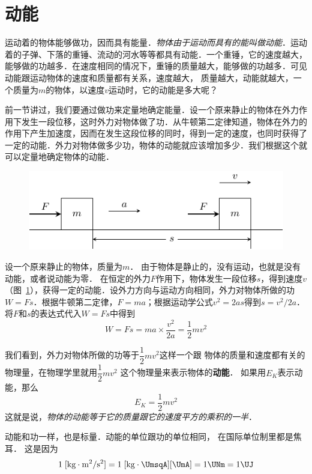 \section{动能}
运动着的物体能够做功，因而具有能量．\textit{物体由于运动而具有的能叫做动能}．运动着的子弹、下落的重锤、流动的河水等等都具有动能．一个重锤，它的速度越大，能够做的功越多．在速度相同的情况下，重锤的质量越大，能够做的功越多．可见动能跟运动物体的速度和质量都有关系，速度越大，
质量越大，动能就越大，一个质量为$m$的物体，以速度$v$运动时，它的动能是多大呢？
	
前一节讲过，我们要通过做功来定量地确定能量．设一个原来静止的物体在外力作用下发生一段位移，这时外力对物体做了功．从牛顿第二定律知道，物体在外力的作用下产生加速度，因而在发生这段位移的同时，得到一定的速度，也同时获得了一定的动能．外力对物体做多少功，物体的动能就应该增加多少．我们根据这个就可以定量地确定物体的动能．

\begin{figure}[htbp]
    \centering
    \includegraphics{fig/A/7-6.pdf}
    \caption{}\label{fig_A_7-6}
\end{figure}

设一个原来静止的物体，质量为$m$．
由于物体是静止的，没有运动，也就是没有动能，或者说动能为零．
在恒定的外力$F$作用下，物体发生一段位移$s$，得到速度$v$（图~\ref{fig_A_7-6}），获得一定的动能．设外力方向与运动方向相同，外力对物体所做的功$W=Fs$．根据牛顿第二定律，$F=ma$；根据运动学公式$v^2=2as$得到$s=v^2/2a$．将$F$和$s$的表达式代入$W=Fs$中得到
\[W=Fs=ma\times \frac{v^2}{2a}=\frac{1}{2}mv^2 \]

我们看到，外力对物体所做的功等于$\dfrac{1}{2}mv^2$这样一个跟
物体的质量和速度都有关的物理量，在物理学里就用$\dfrac{1}{2}mv^2$
这个物理量来表示物体的\textbf{动能}．
如果用$E_K$表示动能，那么	
\[E_K=\frac{1}{2}mv^2 \]
这就是说，\textit{物体的动能等于它的质量跟它的速度平方的乘积的一半}．

动能和功一样，也是标量．动能的单位跟功的单位相同，
在国际单位制里都是焦耳．
这是因为
\[1\; [{\rm kg}\cdot {\rm m^2}/{\rm s^2}]=1 \; [{\rm kg}\cdot \UmsqA ][\UmA]=1\UNm=1\UJ \]


